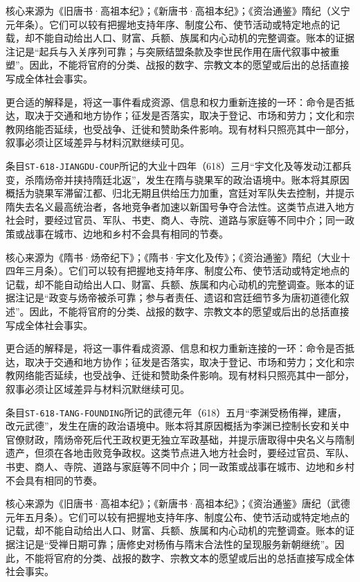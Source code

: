 核心来源为《旧唐书·高祖本纪》；《新唐书·高祖本纪》；《资治通鉴》隋纪（义宁元年条）。它们可以较有把握地支持年序、制度公布、使节活动或特定地点的记载，却不能自动给出人口、财富、兵额、族属和内心动机的完整调查。账本的证据注记是“起兵与入关序列可靠；与突厥结盟条款及李世民作用在唐代叙事中被重塑”。因此，不能将官府的分类、战报的数字、宗教文本的愿望或后出的总括直接写成全体社会事实。

更合适的解释是，将这一事件看成资源、信息和权力重新连接的一环：命令是否抵达，取决于交通和地方协作；征发是否落实，取决于登记、市场和劳力；文化和宗教网络能否延续，也受战争、迁徙和赞助条件影响。现有材料只照亮其中一部分，叙事必须让区域差异与材料沉默继续可见。


条目\texttt{ST-618-JIANGDU-COUP}所记的大业十四年（618）三月“宇文化及等发动江都兵变，杀隋炀帝并挟持隋廷北返”，发生在隋与骁果军的政治语境中。账本将其原因概括为骁果军滞留江都、归北无期且供给压力加重，宫廷对军队失去控制，并提示隋失去名义最高统治者，各地竞争者加速以新国号争夺合法性。这类节点进入地方社会时，要经过官员、军队、书吏、商人、寺院、道路与家庭等不同中介；同一政策或战事在城市、边地和乡村不会具有相同的节奏。

核心来源为《隋书·炀帝纪下》；《隋书·宇文化及传》；《资治通鉴》隋纪（大业十四年三月条）。它们可以较有把握地支持年序、制度公布、使节活动或特定地点的记载，却不能自动给出人口、财富、兵额、族属和内心动机的完整调查。账本的证据注记是“政变与炀帝被杀可靠；参与者责任、遗诏和宫廷细节多为唐初道德化叙述”。因此，不能将官府的分类、战报的数字、宗教文本的愿望或后出的总括直接写成全体社会事实。

更合适的解释是，将这一事件看成资源、信息和权力重新连接的一环：命令是否抵达，取决于交通和地方协作；征发是否落实，取决于登记、市场和劳力；文化和宗教网络能否延续，也受战争、迁徙和赞助条件影响。现有材料只照亮其中一部分，叙事必须让区域差异与材料沉默继续可见。


条目\texttt{ST-618-TANG-FOUNDING}所记的武德元年（618）五月“李渊受杨侑禅，建唐，改元武德”，发生在唐的政治语境中。账本将其原因概括为李渊已控制长安和关中官僚财政，隋炀帝死后代王政权更无独立军政基础，并提示唐取得中央名义与隋制遗产，但须在各地击败竞争政权。这类节点进入地方社会时，要经过官员、军队、书吏、商人、寺院、道路与家庭等不同中介；同一政策或战事在城市、边地和乡村不会具有相同的节奏。

核心来源为《旧唐书·高祖本纪》；《新唐书·高祖本纪》；《资治通鉴》唐纪（武德元年五月条）。它们可以较有把握地支持年序、制度公布、使节活动或特定地点的记载，却不能自动给出人口、财富、兵额、族属和内心动机的完整调查。账本的证据注记是“受禅日期可靠；唐修史对杨侑与隋末合法性的呈现服务新朝继统”。因此，不能将官府的分类、战报的数字、宗教文本的愿望或后出的总括直接写成全体社会事实。

